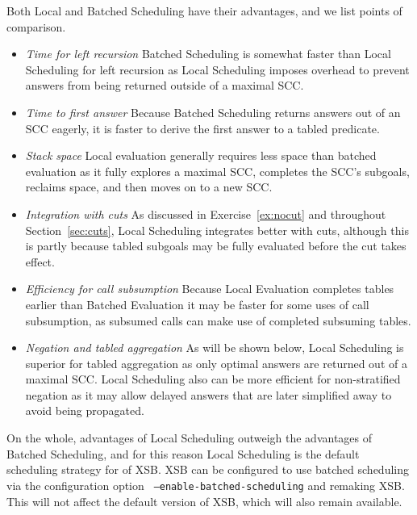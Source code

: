 Both Local and Batched Scheduling have their advantages, and we list
points of comparison.

\begin{itemize}

\item {\em Time for left recursion} Batched Scheduling is somewhat
  faster than Local Scheduling for left recursion as Local Scheduling
  imposes overhead to prevent answers from being returned outside of
  a maximal SCC.  

\item {\em Time to first answer}  Because Batched Scheduling returns
  answers out of an SCC eagerly, it is faster to derive the first
  answer to a tabled predicate.

\item {\em Stack space} Local evaluation generally requires less space
  than batched evaluation as it fully explores a maximal SCC,
  completes the SCC's subgoals, reclaims space, and then moves on to a
  new SCC.  

\item {\em Integration with cuts} As discussed in
  Exercise~\ref{ex:nocut} and throughout Section~\ref{sec:cuts}, Local
  Scheduling integrates better with cuts, although this is partly
  because tabled subgoals may be fully evaluated before the cut takes
  effect. 

\item {\em Efficiency for call subsumption} Because Local Evaluation
  completes tables earlier than Batched Evaluation it may be faster
  for some uses of call subsumption, as subsumed calls can make use of
  completed subsuming tables.

\item {\em Negation and tabled aggregation} As will be shown below,
  Local Scheduling is superior for tabled aggregation as only optimal
  answers are returned out of a maximal SCC.  Local Scheduling also
  can be more efficient for non-stratified negation as it may allow
  delayed answers that are later simplified away to avoid being
  propagated.
\end{itemize}

On the whole, advantages of Local Scheduling outweigh the advantages of
Batched Scheduling, and for this reason Local Scheduling is the
default scheduling strategy for \version{} of XSB.  XSB can be
configured to use batched scheduling via the configuration option {\tt
  --enable-batched-scheduling} and remaking XSB\@.  This will not
affect the default version of XSB, which will also remain available.

